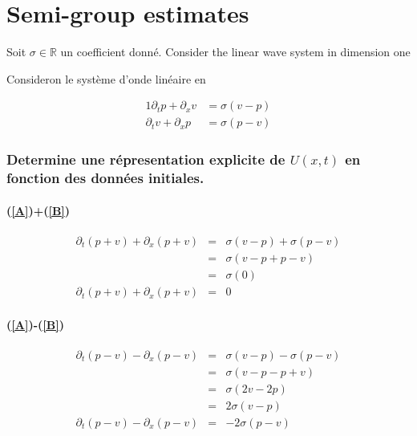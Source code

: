 \documentclass[a4paper,11pt]{article}
\begin{document}
\part{Semi-group estimates}
Soit \( \sigma \in \mathbb{R} \) un coefficient donné. Consider the linear wave system in dimension one

Consideron le système d'onde linéaire en

\renewcommand{\theequation}{\Alph{equation}}

\begin{alignat}{1}
    \partial_{t}p + \partial_{x}v &= \sigma(v-p) \label{A} \\
    \partial_{t}v + \partial_{x}p &= \sigma(p-v) \label{B}
\end{alignat}

\setcounter{equation}{0}
\renewcommand{\theequation}{\arabic{equation}}

\section{Determine une répresentation explicite de \( U(x, t) \) en fonction des données initiales.}
\subsection*{(\ref{A})+(\ref{B})}

\begin{equation*}
    \begin{array}{rcl}
        \partial_{t}(p+v) + \partial_{x}(p+v) &=& \sigma(v-p) + \sigma(p-v) \\
        &=& \sigma(v-p + p-v) \\
        &=& \sigma(0) \\
        \partial_{t}(p+v) + \partial_{x}(p+v) &=& 0
    \end{array}
\end{equation*}

\subsection*{(\ref{A})-(\ref{B})}

\begin{equation*}
\begin{array}{rcl}
    \partial_{t}(p-v) - \partial_{x}(p-v) &=& \sigma(v-p) - \sigma(p-v) \\
    &=& \sigma(v-p - p+v) \\
    &=& \sigma(2v-2p) \\
    &=& 2\sigma(v-p) \\
    \partial_{t}(p-v) - \partial_{x}(p-v) &=& -2\sigma(p-v)
\end{array}
\end{equation*}
\end{document}
